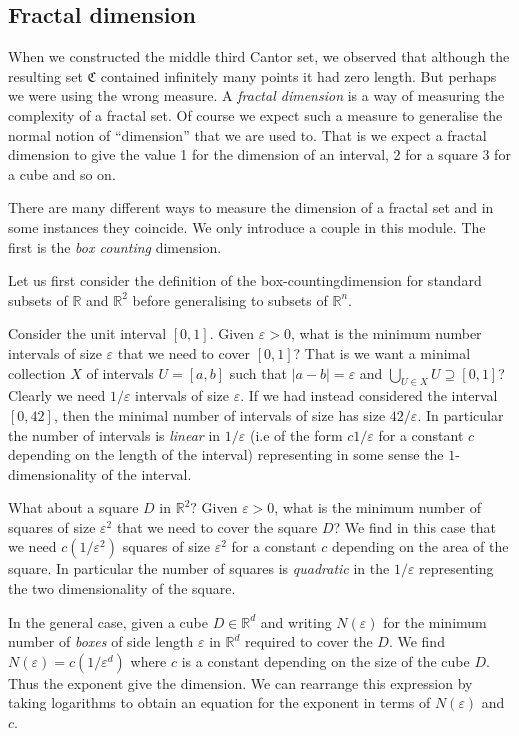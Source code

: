 \documentclass[
  a4paper,
  oneside,
  final]{krantz}
\newcommand{\R}{\mathbb{R}}
\renewcommand{\epsilon}{\varepsilon}
\newcommand{\CC}{\mathfrak{C}}
\theoremstyle{definition}
\theoremstyle{definition}
\theoremstyle{definition}
\theoremstyle{definition}
\theoremstyle{remark}
\begin{document}
\hypertarget{fractaldim}{%
\subsection{Fractal dimension}\label{fractaldim}}

When we constructed the middle third Cantor set, we observed that although the resulting set \(\CC\) contained infinitely many points it had zero length. But perhaps we were using the wrong measure. A \emph{fractal dimension} is a way of measuring the complexity of a fractal set. Of course we expect such a measure to generalise the normal notion of ``dimension'' that we are used to. That is we expect a fractal dimension to give the value 1 for the dimension of an interval, 2 for a square 3 for a cube and so on.

There are many different ways to measure the dimension of a fractal set and in some instances they coincide. We only introduce a couple in this module. The first is the \emph{box counting} dimension.

Let us first consider the definition of the box-countingdimension for standard subsets of \(\R\) and \(\R^2\) before generalising to subsets of \(\R^n\).

Consider the unit interval \([0,1]\). Given \(\epsilon >0\), what is the minimum number intervals of size \(\epsilon\) that we need to cover \([0,1]\)? That is we want a minimal collection \(X\) of intervals \(U=[a,b]\) such that \(|a-b| = \epsilon\) and \(\bigcup_{U \in X} U \supseteq [0,1]\)? Clearly we need \(1/\epsilon\) intervals of size \(\epsilon\). If we had instead considered the interval \([0, 42]\), then the minimal number of intervals of size has size \(42/\epsilon\). In particular the number of intervals is \emph{linear} in \(1/\epsilon\) (i.e of the form \(c 1/\epsilon\) for a constant \(c\) depending on the length of the interval) representing in some sense the \(1\)-dimensionality of the interval.

What about a square \(D\) in \(\R^2?\) Given \(\epsilon >0\), what is the minimum number of squares of size \(\epsilon^2\) that we need to cover the square \(D\)? We find in this case that we need \(c(1/\epsilon^2)\) squares of size \(\epsilon^2\) for a constant \(c\) depending on the area of the square. In particular the number of squares is \emph{quadratic} in the \(1/\epsilon\) representing the two dimensionality of the square.

In the general case, given a cube \(D \in \R^{d}\) and writing \(N(\epsilon)\) for the minimum number of \emph{boxes} of side length \(\epsilon\) in \(\R^{d}\) required to cover the \(D\). We find \(N(\epsilon) = c(1/\epsilon^{d})\) where \(c\) is a constant depending on the size of the cube \(D\). Thus the exponent give the dimension. We can rearrange this expression by taking logarithms to obtain an equation for the exponent in terms of \(N(\epsilon)\) and \(c\).
\end{document}
